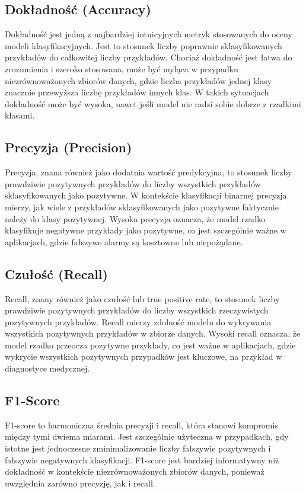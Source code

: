 \subsection*{Dokładność (Accuracy)}

Dokładność jest jedną z najbardziej intuicyjnych metryk stosowanych do oceny modeli klasyfikacyjnych. 
Jest to stosunek liczby poprawnie sklasyfikowanych przykładów do całkowitej liczby przykładów. 
Chociaż dokładność jest łatwa do zrozumienia i szeroko stosowana, może być myląca w przypadku 
niezrównoważonych zbiorów danych, gdzie liczba przykładów jednej klasy znacznie przewyższa liczbę 
przykładów innych klas. W takich sytuacjach dokładność może być wysoka, nawet jeśli model nie radzi 
sobie dobrze z rzadkimi klasami.

\subsection*{Precyzja (Precision)}

Precyzja, znana również jako dodatnia wartość predykcyjna, to stosunek liczby prawdziwie pozytywnych 
przykładów do liczby wszystkich przykładów sklasyfikowanych jako pozytywne. W kontekście klasyfikacji 
binarnej precyzja mierzy, jak wiele z przykładów sklasyfikowanych jako pozytywne faktycznie należy do 
klasy pozytywnej. Wysoka precyzja oznacza, że model rzadko klasyfikuje negatywne przykłady jako 
pozytywne, co jest szczególnie ważne w aplikacjach, gdzie fałszywe alarmy są kosztowne lub niepożądane.

\subsection*{Czułość (Recall)}

Recall, znany również jako czułość lub true positive rate, to stosunek liczby prawdziwie pozytywnych 
przykładów do liczby wszystkich rzeczywistych pozytywnych przykładów. Recall mierzy zdolność modelu 
do wykrywania wszystkich pozytywnych przykładów w zbiorze danych. Wysoki recall oznacza, że model 
rzadko przeocza pozytywne przykłady, co jest ważne w aplikacjach, gdzie wykrycie wszystkich 
pozytywnych przypadków jest kluczowe, na przykład w diagnostyce medycznej.

\subsection*{F1-Score}

F1-score to harmoniczna średnia precyzji i recall, która stanowi kompromis między tymi dwiema miarami. 
Jest szczególnie użyteczna w przypadkach, gdy istotne jest jednoczesne zminimalizowanie liczby 
fałszywie pozytywnych i fałszywie negatywnych klasyfikacji. F1-score jest bardziej informatywny niż 
dokładność w kontekście niezrównoważonych zbiorów danych, ponieważ uwzględnia zarówno precyzję, 
jak i recall.

